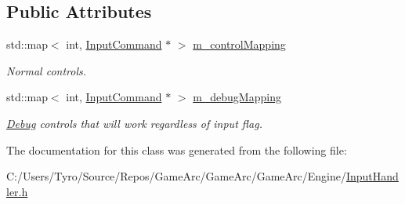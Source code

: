 \subsection*{Public Attributes}
\begin{DoxyCompactItemize}
\item 
\mbox{\label{class_input_handler_abe853597d11b94e0668c8db6638a0548}} 
std\+::map$<$ int, \mbox{\hyperlink{class_input_command}{Input\+Command}} $\ast$ $>$ \mbox{\hyperlink{class_input_handler_abe853597d11b94e0668c8db6638a0548}{m\+\_\+control\+Mapping}}
\begin{DoxyCompactList}\small\item\em Normal controls. \end{DoxyCompactList}\item 
\mbox{\label{class_input_handler_ab472e9acd5163f068a3d009f8415fab1}} 
std\+::map$<$ int, \mbox{\hyperlink{class_input_command}{Input\+Command}} $\ast$ $>$ \mbox{\hyperlink{class_input_handler_ab472e9acd5163f068a3d009f8415fab1}{m\+\_\+debug\+Mapping}}
\begin{DoxyCompactList}\small\item\em \mbox{\hyperlink{class_debug}{Debug}} controls that will work regardless of input flag. \end{DoxyCompactList}\end{DoxyCompactItemize}


The documentation for this class was generated from the following file\+:\begin{DoxyCompactItemize}
\item 
C\+:/\+Users/\+Tyro/\+Source/\+Repos/\+Game\+Arc/\+Game\+Arc/\+Game\+Arc/\+Engine/\mbox{\hyperlink{_input_handler_8h}{Input\+Handler.\+h}}\end{DoxyCompactItemize}
